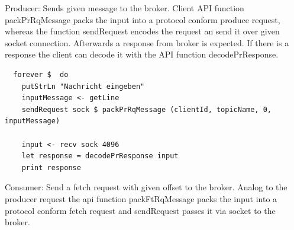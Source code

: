Producer: Sends given message to the broker. Client API function packPrRqMessage
packs the input into a protocol conform produce request, whereas the function
sendRequest encodes the request an send it over given socket connection.
Afterwards a response from broker is expected. If there is a response the client
can decode it with the API function decodePrResponse. 
\begin{lstlisting}
  forever $  do 
    putStrLn "Nachricht eingeben"
    inputMessage <- getLine
    sendRequest sock $ packPrRqMessage (clientId, topicName, 0, inputMessage)

    input <- recv sock 4096
    let response = decodePrResponse input
    print response 
\end{lstlisting}

Consumer: Send a fetch request with given offset to the broker. Analog to the producer request 
the api function packFtRqMessage packs the input into a protocol conform fetch request and sendRequest passes it via socket to the broker. 


